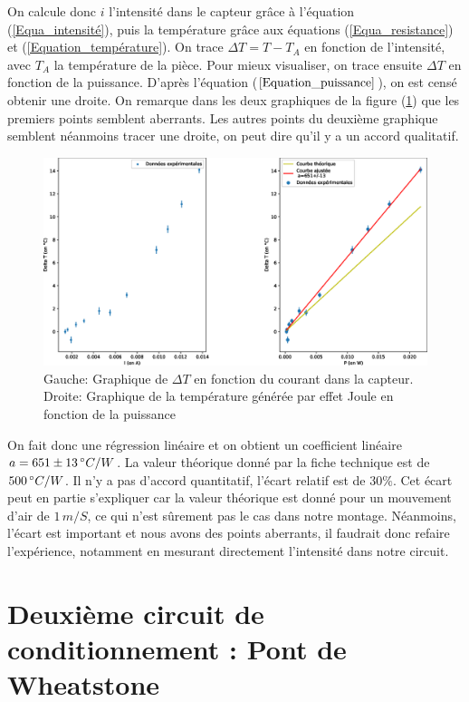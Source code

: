\documentclass[12pt]{article}
\begin{document}
On calcule donc $i$ l'intensité dans le capteur grâce à l'équation (\ref{Equa_intensité}), puis la température grâce aux équations (\ref{Equa_resistance}) et (\ref{Equation_température}). On trace $\Delta T=T-T_A$ en fonction de l'intensité, avec $T_A$ la température de la pièce. Pour mieux visualiser, on trace ensuite $\Delta T$ en fonction de la puissance. D'après l'équation ($\ref{Equation_puissance}$), on est censé obtenir une droite. On remarque dans les deux graphiques de la figure (\ref{Graphe_puissance}) que les premiers points semblent aberrants. Les autres points du deuxième graphique semblent néanmoins tracer une droite, on peut dire qu'il y a un accord qualitatif.
\begin{figure}[h!]
	\begin{center}
		\includegraphics[scale=0.5]{Graphe2_puissance.eps}		
		\caption{Gauche: Graphique de $\Delta T$ en fonction du courant dans la capteur. Droite: Graphique de la température générée par effet Joule en fonction de la puissance}
		\label{Graphe_puissance}
	\end{center}
\end{figure}

 On fait donc une régression linéaire et on obtient  un coefficient linéaire $a=651\pm 13\, \degree C/W$. La valeur théorique donné par la fiche technique est de $500\, \degree C/W$. Il n'y a pas d'accord quantitatif, l'écart relatif est de $30\%$. Cet écart peut en partie s'expliquer car la valeur théorique est donné pour un mouvement d'air de $1\, m/S$, ce qui n'est sûrement pas le cas dans notre montage. Néanmoins, l'écart est important et nous avons des points aberrants, il faudrait donc refaire l'expérience, notamment en mesurant directement l'intensité dans notre circuit. 

\section{Deuxième circuit de conditionnement : Pont de Wheatstone}
\end{document}
